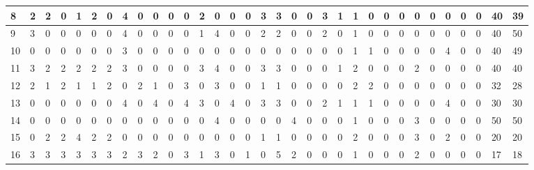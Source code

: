 \begin{table}[h!]
\begin{adjustwidth}{0.3in}{}
{{\begin{tabular}{l|l|l|l|l|l|l|l|l|l|l|l|l|l|l|l|l|l|l|l|l|l|l|l|l|l|l|l|l|l|l|l|l|}
	\hline
	\multicolumn{1}{|l|}{8}                                     & 2 & 2 & 0 & 1 & 2 & 0 & 4  & 0 & 0 & 0  & 0  & 2  & 0  & 0  & 0  & 3  & 3  & 0  & 0  & 3  & 1  & 1  & 0  & 0  & 0  & 0  & 0  & 0  & 0  & 0  & 40                 & 39                  \\ 
	\hline
	\multicolumn{1}{|l|}{9}                                     & 3 & 0 & 0 & 0 & 0 & 0 & 4  & 0 & 0 & 0  & 0  & 1  & 4  & 0  & 0  & 2  & 2  & 0  & 0  & 2  & 0  & 1  & 0  & 0  & 0  & 0  & 0  & 0  & 0  & 0  & 40                 & 50                  \\ 
	\hline
	\multicolumn{1}{|l|}{10}                                    & 0 & 0 & 0 & 0 & 0 & 0 & 3  & 0 & 0 & 0  & 0  & 0  & 0  & 0  & 0  & 0  & 0  & 0  & 0  & 0  & 0  & 1  & 1  & 0  & 0  & 0  & 0  & 4  & 0  & 0  & 40                 & 49                  \\ 
	\hline
	\multicolumn{1}{|l|}{11}                                    & 3 & 2 & 2 & 2 & 2 & 2 & 3  & 0 & 0 & 0  & 0  & 3  & 4  & 0  & 0  & 3  & 3  & 0  & 0  & 0  & 1  & 2  & 0  & 0  & 0  & 2  & 0  & 0  & 0  & 0  & 40                 & 40                  \\ 
	\hline
	\multicolumn{1}{|l|}{12}                                    & 2 & 1 & 2 & 1 & 1 & 2 & 0  & 2 & 1 & 0  & 3  & 0  & 3  & 0  & 0  & 1  & 1  & 0  & 0  & 0  & 0  & 2  & 2  & 0  & 0  & 0  & 0  & 0  & 0  & 0  & 32                 & 28                  \\ 
	\hline
	\multicolumn{1}{|l|}{13}                                    & 0 & 0 & 0 & 0 & 0 & 0 & 4  & 0 & 4 & 0  & 4  & 3  & 0  & 4  & 0  & 3  & 3  & 0  & 0  & 2  & 1  & 1  & 1  & 0  & 0  & 0  & 0  & 4  & 0  & 0  & 30                 & 30                  \\ 
	\hline
	\multicolumn{1}{|l|}{14}                                    & 0 & 0 & 0 & 0 & 0 & 0 & 0  & 0 & 0 & 0  & 0  & 0  & 4  & 0  & 0  & 0  & 0  & 4  & 0  & 0  & 0  & 1  & 0  & 0  & 0  & 3  & 0  & 0  & 0  & 0  & 50                 & 50                  \\ 
	\hline
	\multicolumn{1}{|l|}{15}                                    & 0 & 2 & 2 & 4 & 2 & 2 & 0  & 0 & 0 & 0  & 0  & 0  & 0  & 0  & 0  & 1  & 1  & 0  & 0  & 0  & 0  & 2  & 0  & 0  & 0  & 3  & 0  & 2  & 0  & 0  & 20                 & 20                  \\ 
	\hline
	\multicolumn{1}{|l|}{16}                                    & 3 & 3 & 3 & 3 & 3 & 3 & 2  & 3 & 2 & 0  & 3  & 1  & 3  & 0  & 1  & 0  & 5  & 2  & 0  & 0  & 0  & 1  & 0  & 0  & 0  & 2  & 0  & 0  & 0  & 0  & 17                 & 18                  \\ 

\end{tabular}}}
\end{adjustwidth}
\end{table}
